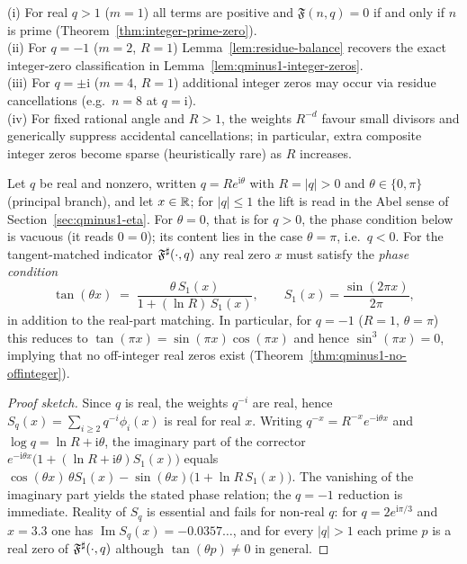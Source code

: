 \begin{corollary}
\label{cor:special-cases}
(i) For real $q>1$ ($m=1$) all terms are positive and $\mathfrak F(n,q)=0$ if and only if $n$ is prime (Theorem~\ref{thm:integer-prime-zero}).\\
(ii) For $q=-1$ ($m=2$, $R=1$) Lemma~\ref{lem:residue-balance} recovers the exact integer-zero classification in Lemma~\ref{lem:qminus1-integer-zeros}.\\
(iii) For $q=\pm\mathrm{i}$ ($m=4$, $R=1$) additional integer zeros may occur via residue cancellations (e.g.\ $n=8$ at $q=\mathrm{i}$).\\
(iv) For fixed rational angle and $R>1$, the weights $R^{-d}$ favour small divisors and generically suppress accidental cancellations; in particular, extra composite integer zeros become sparse (heuristically rare) as $R$ increases.
\end{corollary}

\begin{proposition}
\label{prop:phase-locking}
Let $q$ be real and nonzero, written $q=R e^{\mathrm{i}\theta}$ with $R=|q|>0$ and $\theta\in\{0,\pi\}$ (principal branch), and let $x\in\mathbb{R}$; for $|q|\le1$ the lift is read in the Abel sense of Section~\ref{sec:qminus1-eta}. For $\theta=0$, that is for $q>0$, the phase condition below is vacuous (it reads $0=0$); its content lies in the case $\theta=\pi$, i.e.\ $q<0$.
For the tangent-matched indicator $\mathfrak F^{\sharp}(\cdot,q)$ any real zero $x$ must satisfy the \emph{phase condition}
\[
\tan(\theta x)\;=\;\frac{\theta\,S_1(x)}{1+(\ln R)\,S_1(x)},
\qquad S_1(x)=\frac{\sin(2\pi x)}{2\pi},
\]
in addition to the real-part matching. In particular, for $q=-1$ ($R=1$, $\theta=\pi$) this reduces to
$\tan(\pi x)=\sin(\pi x)\cos(\pi x)$ and hence $\sin^3(\pi x)=0$, implying that no off-integer real zeros exist
(Theorem~\ref{thm:qminus1-no-offinteger}).
\end{proposition}

\begin{proof}[Proof sketch]
Since $q$ is real, the weights $q^{-i}$ are real, hence $S_q(x)=\sum_{i\ge2}q^{-i}\phi_i(x)$ is real for real $x$. Writing $q^{-x}=R^{-x}e^{-\mathrm{i}\theta x}$ and
$\log q=\ln R+\mathrm{i}\theta$, the imaginary part of the corrector
$e^{-\mathrm{i}\theta x}\bigl(1+(\ln R+\mathrm{i}\theta)S_1(x)\bigr)$ equals
$\cos(\theta x)\,\theta S_1(x)-\sin(\theta x)\bigl(1+\ln R\,S_1(x)\bigr)$.
The vanishing of the imaginary part yields the stated phase relation; the $q=-1$ reduction is immediate. Reality of $S_q$ is essential and fails for non-real $q$: for $q=2e^{\mathrm{i}\pi/3}$ and $x=3.3$ one has $\operatorname{Im}S_q(x)=-0.0357\ldots$, and for every $|q|>1$ each prime $p$ is a real zero of $\mathfrak F^{\sharp}(\cdot,q)$ although $\tan(\theta p)\neq0$ in general.
\end{proof}

